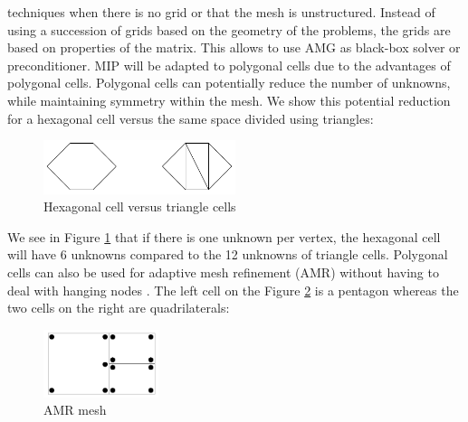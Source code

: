techniques when there is no grid or that the mesh is unstructured. Instead of
using a succession of grids based on the geometry of the problems, the grids
are based on properties of the matrix. This allows to use AMG as black-box
solver or preconditioner. MIP will be adapted to polygonal cells due to the
advantages of polygonal cells. Polygonal cells can 
potentially reduce the number of unknowns, while maintaining symmetry 
within the mesh. We show this potential reduction for a hexagonal cell versus 
the same space divided using triangles:
\begin{figure}[H]
\centering
\includegraphics[width=0.5\textwidth]{./Introduction/hex_tri_cells}
\caption{Hexagonal cell versus triangle cells}
\label{fig_hex_tri}
\end{figure}
We see in Figure \ref{fig_hex_tri} that if there is one unknown per vertex, 
the hexagonal cell will have 6
unknowns compared to the 12 unknowns of triangle cells. Polygonal cells can
also be used for adaptive mesh refinement (AMR) without having to
deal with hanging nodes 
\cite{locally_hanging_nodes,arbitrary_hanging_nodes,dealII_hanging_nodes}. The 
left cell on the Figure \ref{fig_amr_mesh} is a pentagon whereas the two cells 
on the right are quadrilaterals:
\begin{figure}[H]
\centering
\includegraphics[width=0.3\textwidth]{./Introduction/amr}
\caption{AMR mesh}
\label{fig_amr_mesh}
\end{figure}

